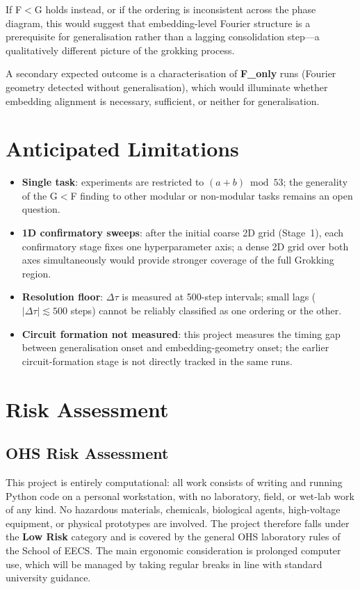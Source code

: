 \documentclass[12pt,openany,a4paper]{book}
\newcommand{\Dtau}{\Delta\tau}
\begin{document}
If F$<$G holds instead, or if the ordering is inconsistent across the
phase diagram, this would suggest that embedding-level Fourier structure
is a prerequisite for generalisation rather than a lagging consolidation
step---a qualitatively different picture of the grokking process.

A secondary expected outcome is a characterisation of \textbf{F\_only}
runs (Fourier geometry detected without generalisation), which would
illuminate whether embedding alignment is necessary, sufficient, or
neither for generalisation.

\section{Anticipated Limitations}

\begin{itemize}
  \item \textbf{Single task}: experiments are restricted to
    $(a+b)\bmod 53$; the generality of the G$<$F finding to other
    modular or non-modular tasks remains an open question.
  \item \textbf{1D confirmatory sweeps}: after the initial coarse 2D
    grid (Stage~1), each confirmatory stage fixes one hyperparameter
    axis; a dense 2D grid over both axes simultaneously would provide
    stronger coverage of the full Grokking region.
  \item \textbf{Resolution floor}: $\Dtau$ is measured at 500-step
    intervals; small lags ($|\Dtau|\lesssim500$ steps) cannot be
    reliably classified as one ordering or the other.
  \item \textbf{Circuit formation not measured}: this project measures
    the timing gap between generalisation onset and embedding-geometry
    onset; the earlier circuit-formation stage is not directly tracked
    in the same runs.
\end{itemize}

\section{Risk Assessment}

\subsection{OHS Risk Assessment}

This project is entirely computational: all work consists of writing and running Python code on a personal workstation, with no laboratory, field, or wet-lab work of any kind.
No hazardous materials, chemicals, biological agents, high-voltage
equipment, or physical prototypes are involved.
The project therefore falls under the \textbf{Low Risk} category
and is covered by the general OHS laboratory rules of the School
of EECS.
The main ergonomic consideration is prolonged computer use, which will be managed by taking regular breaks in line with standard university guidance.
\end{document}
